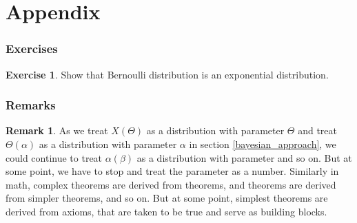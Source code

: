 \documentclass[14pt, reqno]{amsart}
\theoremstyle{definition}
\newtheorem{exercise}[theorem]{Exercise}
\newtheorem{remark}[theorem]{Remark}
\begin{document}
\part{Appendix}

\section{Exercises}
\begin{exercise} Show that Bernoulli distribution is an exponential distribution.
\end{exercise}

\section{Remarks}
\begin{remark} As we treat $X(\Theta)$ as a distribution with parameter $\Theta$ and treat $\Theta(\alpha)$ as a distribution with parameter $\alpha$ in section \ref{bayesian_approach}, we could continue to treat $\alpha(\beta)$ as a distribution with parameter and so on. But at some point, we have to stop and treat the parameter as a number. Similarly in math, complex theorems are derived from theorems, and theorems are derived from simpler theorems, and so on. But at some point, simplest theorems are derived from axioms, that are taken to be true and serve as building blocks. 
\end{remark}
\end{document}
